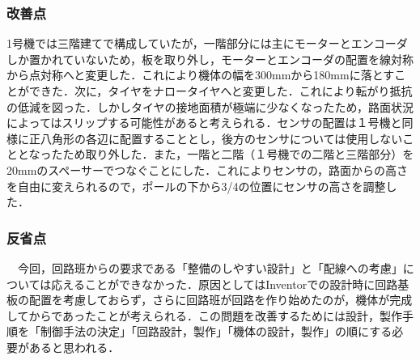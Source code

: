 \documentclass{jsarticle}
\begin{document}
\subsubsection{改善点}
1号機では三階建てで構成していたが，一階部分には主にモーターとエンコーダしか置かれていないため，板を取り外し，モーターとエンコーダの配置を線対称から点対称へと変更した．これにより機体の幅を300mmから180mmに落とすことができた．次に，タイヤをナロータイヤへと変更した．これにより転がり抵抗の低減を図った．しかしタイヤの接地面積が極端に少なくなったため，路面状況によってはスリップする可能性があると考えられる．センサの配置は１号機と同様に正八角形の各辺に配置することとし，後方のセンサについては使用しないこととなったため取り外した．また，一階と二階（１号機での二階と三階部分）を20mmのスペーサーでつなぐことにした．これによりセンサの，路面からの高さを自由に変えられるので，ポールの下から3/4の位置にセンサの高さを調整した．

\subsubsection{反省点}
　今回，回路班からの要求である「整備のしやすい設計」と「配線への考慮」については応えることができなかった．原因としてはInventorでの設計時に回路基板の配置を考慮しておらず，さらに回路班が回路を作り始めたのが，機体が完成してからであったことが考えられる．この問題を改善するためには設計，製作手順を「制御手法の決定」「回路設計，製作」「機体の設計，製作」の順にする必要があると思われる．
\end{document}
